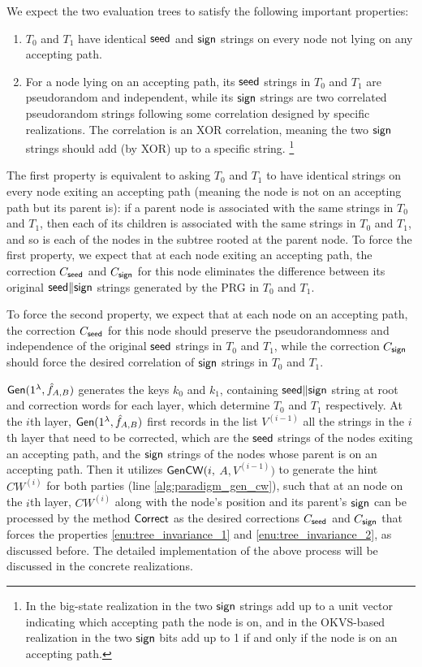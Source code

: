 We expect the two evaluation trees to satisfy the following important properties: 
\begin{enumerate}
  \item\label{enu:tree_invariance_1} $T_0$ and $T_1$ have identical ${\sf seed}$ and ${\sf sign}$ strings on every node not lying on any accepting path.
  \item\label{enu:tree_invariance_2} For a node lying on an accepting path, its ${\sf seed}$ strings in $T_0$ and $T_1$ are pseudorandom and independent, while its ${\sf sign}$ strings are two correlated pseudorandom strings following some  correlation designed by specific realizations. The correlation is an XOR correlation, meaning the two ${\sf sign}$ strings should add (by XOR) up to a specific string.  \footnote{In the big-state realization in  the two ${\sf sign}$ strings add up to a unit vector indicating which accepting path the node is on, and in the OKVS-based realization in  the two ${\sf sign}$ bits add up to 1 if and only if the node is on an accepting path. }
\end{enumerate}  
The first property is equivalent to asking $T_0$ and $T_1$ to have identical strings on every node exiting an accepting path (meaning the node is not on an accepting path but its parent is): if a parent node is associated with the same strings in $T_0$ and $T_1$, then each of its children is associated with the same strings in $T_0$ and $T_1$, and so is each of the nodes in the subtree rooted at the parent node. 
To force the first property, we expect that at each node exiting an accepting path, the correction $C_{\sf seed}$ and $C_{\sf sign}$ for this node eliminates the difference between its original ${\sf seed}\|{\sf sign}$ strings generated by the PRG in $T_0$ and $T_1$. 

To force the second property, we expect that at each node on an accepting path, the correction $C_{\sf seed}$ for this node should preserve the pseudorandomness and independence of the original ${\sf seed}$ strings in $T_0$ and $T_1$, while the correction $C_{\sf sign}$ should force the desired correlation of ${\sf sign}$ strings in $T_0$ and $T_1$. 

${\sf Gen}(1^\lambda, \hat{f}_{A,B})$ generates the keys $k_0$ and $k_1$, containing ${\sf seed}\|{\sf sign}$ string at root and correction words for each layer, which determine $T_0$ and $T_1$ respectively. 
At the $i$th layer, ${\sf Gen}(1^\lambda, \hat{f}_{A,B})$ first records in the list $V^{(i-1)}$ all the strings in the $i$th layer that need to be corrected, which are the ${\sf seed}$ strings of the nodes exiting an accepting path, and the ${\sf sign}$ strings of the nodes whose parent is on an accepting path. Then it utilizes ${\sf GenCW}(i,$ $A, V^{(i-1)})$ to generate the hint $CW^{(i)}$ for both parties (line \ref{alg:paradigm_gen_cw}), such that at an node on the $i$th layer, $CW^{(i)}$ along with the node's position and its parent's ${\sf sign}$ can be processed by the method ${\sf Correct}$ as the desired corrections $C_{\sf seed}$ and $C_{\sf sign}$ that forces the properties \ref{enu:tree_invariance_1} and \ref{enu:tree_invariance_2}, as discussed before. 
The detailed implementation of the above process will be discussed in the concrete realizations.

